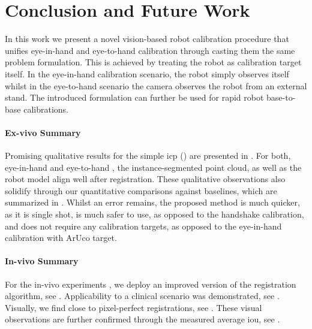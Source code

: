 
\section{Conclusion and Future Work}%
In this work we present a novel vision-based robot calibration procedure that unifies eye-in-hand and eye-to-hand calibration through casting them the same problem formulation. This is achieved by treating the robot as calibration target itself. In the eye-in-hand calibration scenario, the robot simply observes itself whilst in the eye-to-hand scenario the camera observes the robot from an external stand. The introduced formulation can further be used for rapid robot base-to-base calibrations.

\paragraph{Ex-vivo Summary} Promising qualitative results for the simple \acrshort{icp} () are presented in . For both, eye-in-hand  and eye-to-hand , the instance-segmented point cloud, as well as the robot model align well after registration. These qualitative observations also solidify through our quantitative comparisons against baselines, which are summarized in . Whilst an error remains, the proposed method is much quicker, as it is single shot, is much safer to use, as opposed to the handshake calibration, and does not require any calibration targets, as opposed to the eye-in-hand calibration with ArUco target.

\paragraph{In-vivo Summary} For the in-vivo experiments , we deploy an improved version of the registration algorithm, see . Applicability to a clinical scenario was demonstrated, see . Visually, we find close to pixel-perfect registrations, see . These visual observations are further confirmed through the measured average \acrshort{iou}, see .

